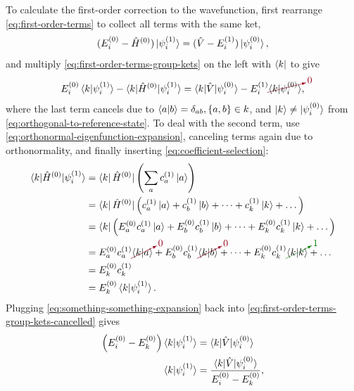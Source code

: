 \documentclass[%
class = book,%
crop = false,%
float = true,%
multi = true,%
preview = false,%
]{standalone}
\begin{document}
To calculate the first-order correction to the wavefunction, first rearrange \eqref{eq:first-order-terms} to collect all terms with the same ket,
\begin{equation}
  \label{eq:first-order-terms-group-kets}
  ( E_{i}^{(0)} - \hat{H}^{(0)} ) \ket{\psi_{i}^{(1)}} = ( \hat{V} - E_{i}^{(1)} ) \ket{\psi_{i}^{(0)}},
\end{equation}
and multiply \eqref{eq:first-order-terms-group-kets} on the left with \(\bra{k}\) to give
\begin{equation}
  \label{eq:first-order-terms-group-kets-cancelled}
  E_{i}^{(0)} \braket{k|\psi_{i}^{(1)}} - \braket{k|\hat{H}^{(0)}|\psi_{i}^{(1)}} = \braket{k|\hat{V}|\psi_{i}^{(0)}} - E_{i}^{(1)} \Ccancelto[carmine]{0}{\braket{k|\psi_{i}^{(0)}}},
\end{equation}
where the last term cancels due to \(\braket{a|b} = \delta_{ab}, \{a,b\}\in k\), and \(\ket{k} \neq \ket{\psi_{i}^{(0)}}\) from \eqref{eq:orthogonal-to-reference-state}. To deal with the second term, use \eqref{eq:orthonormal-eigenfunction-expansion}, canceling terms again due to orthonormality, and finally inserting \eqref{eq:coefficient-selection}:
\begin{equation}
  \label{eq:something-something-expansion}
  \begin{aligned}
    \braket{k|\hat{H}^{(0)}|\psi_{i}^{(1)}} &= \bra{k} \hat{H}^{(0)} | \left( \sum_{a} c_{a}^{(1)} \ket{a} \right) \\
      &= \bra{k} \hat{H}^{(0)}| \left( c_{a}^{(1)} \ket{a} + c_{b}^{(1)} \ket{b} + \dots + c_{k}^{(1)} \ket{k} + \dots \right) \\
      &= \bra{k} \left( E_{a}^{(0)} c_{a}^{(1)} \ket{a} + E_{b}^{(0)} c_{b}^{(1)} \ket{b} + \dots + E_{k}^{(0)} c_{k}^{(1)} \ket{k} + \dots \right) \\
      &= E_{a}^{(0)} c_{a}^{(1)} \Ccancelto[carmine]{0}{\braket{k|a}} + E_{b}^{(0)} c_{b}^{(1)} \Ccancelto[carmine]{0}{\braket{k|b}} + \dots + E_{k}^{(0)} c_{k}^{(1)} \Ccancelto[Green]{1}{\braket{k|k}} + \dots \\
      &= E_{k}^{(0)} c_{k}^{(1)} \\
      &= E_{k}^{(0)} \braket{k|\psi_{i}^{(1)}}.
    \end{aligned}
\end{equation}
Plugging \eqref{eq:something-something-expansion} back into \eqref{eq:first-order-terms-group-kets-cancelled} gives
\begin{align}
  \label{eq:szabo-ostlund-6.11}
  \left( E_{i}^{(0)} - E_{k}^{(0)} \right) \braket{k|\psi_{i}^{(1)}} &= \braket{k|\hat{V}|\psi_{i}^{(0)}} \\
  \label{eq:szabo-ostlund-6.11nl}
  \braket{k|\psi_{i}^{(1)}} &= \frac{\braket{k|\hat{V}|\psi_{i}^{(0)}}}{E_{i}^{(0)} - E_{k}^{(0)}},
\end{align}
\end{document}
